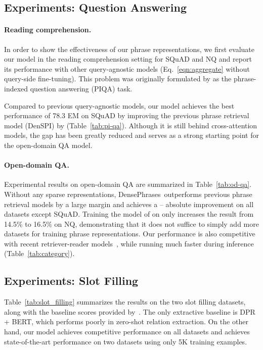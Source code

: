 \documentclass[11pt,a4paper]{article}
\newcommand{\ours}{DensePhrases}
\begin{document}
 \subsection{Experiments: Question Answering}\label{sec:openqa_result}
\paragraph{Reading comprehension.}\label{sec:rc_result}
In order to show the effectiveness of our phrase representations, we first evaluate our model in the reading comprehension setting for SQuAD and NQ and report its performance with other query-agnostic models (Eq.~\eqref{eqn:aggregate} without query-side fine-tuning). This problem was originally formulated by  as the phrase-indexed question answering (PIQA) task.

Compared to previous query-agnostic models, our model achieves the best performance of 78.3 EM on SQuAD by improving the previous phrase retrieval model (DenSPI) by  (Table~\ref{tab:pi-qa}). Although it is still behind cross-attention models, the gap has been greatly reduced and serves as a strong starting point for the open-domain QA model.

\paragraph{Open-domain QA.}
Experimental results on open-domain QA are summarized in Table~\ref{tab:od-qa}.
Without any sparse representations, \ours~outperforms previous phrase retrieval models by a large margin and achieves a -- absolute improvement on all datasets except SQuAD.
Training the model of  on  only increases the result from 14.5\% to 16.5\% on NQ, demonstrating that it does not suffice to simply add more datasets for training phrase representations.
Our performance is also competitive with recent retriever-reader models~\cite{karpukhin2020dense}, while running much faster during inference (Table~\ref{tab:category}).


\subsection{Experiments: Slot Filling}\label{sec:slot_filling}
Table~\ref{tab:slot_filling} summarizes the results on the two slot filling datasets, along with the baseline scores provided by~\citet{petroni2020kilt}.
The only extractive baseline is DPR + BERT, which performs poorly in zero-shot relation extraction.
On the other hand, our model achieves competitive performance on all datasets and achieves state-of-the-art performance on two datasets using only 5K training examples. 
\end{document}
